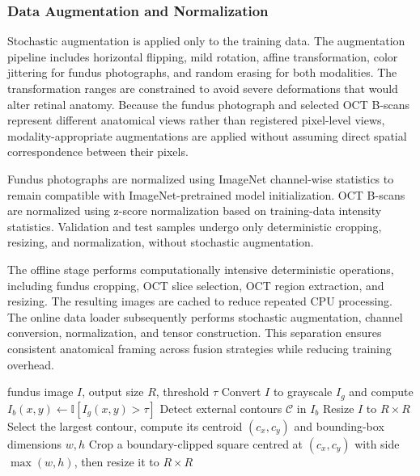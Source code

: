 \documentclass[sn-mathphys]{sn-jnl}%
\theoremstyle{thmstyleone}%
\theoremstyle{thmstyletwo}%
\theoremstyle{thmstylethree}%
\begin{document}
\subsubsection{Data Augmentation and Normalization}
\label{subsubsec:augmentation_normalization}

Stochastic augmentation is applied only to the training data. The augmentation pipeline includes horizontal flipping, mild rotation, affine transformation, color jittering for fundus photographs, and random erasing for both modalities. The transformation ranges are constrained to avoid severe deformations that would alter retinal anatomy. Because the fundus photograph and selected OCT B-scans represent different anatomical views rather than registered pixel-level views, modality-appropriate augmentations are applied without assuming direct spatial correspondence between their pixels.

Fundus photographs are normalized using ImageNet channel-wise statistics to remain compatible with ImageNet-pretrained model initialization. OCT B-scans are normalized using z-score normalization based on training-data intensity statistics. Validation and test samples undergo only deterministic cropping, resizing, and normalization, without stochastic augmentation.

The offline stage performs computationally intensive deterministic operations, including fundus cropping, OCT slice selection, OCT region extraction, and resizing. The resulting images are cached to reduce repeated CPU processing. The online data loader subsequently performs stochastic augmentation, channel conversion, normalization, and tensor construction. This separation ensures consistent anatomical framing across fusion strategies while reducing training overhead.

\begin{algorithm}[!t]
    \caption{Field-of-view-centered fundus ROI extraction}
    \label{alg:fundus_roi}
    \begin{algorithmic}[1]
        \Require fundus image $I$, output size $R$, threshold $\tau$
        \State Convert $I$ to grayscale $I_g$ and compute $I_b(x,y)\leftarrow\mathbb{I}[I_g(x,y)>\tau]$
        \State Detect external contours $\mathcal{C}$ in $I_b$
        \State Resize $I$ to $R\times R$
        \Else
        \State Select the largest contour, compute its centroid $(c_x,c_y)$ and bounding-box dimensions $w,h$
        \State Crop a boundary-clipped square centred at $(c_x,c_y)$ with side $\max(w,h)$, then resize it to $R\times R$
        \EndIf
    \end{algorithmic}
\end{algorithm}
\end{document}
